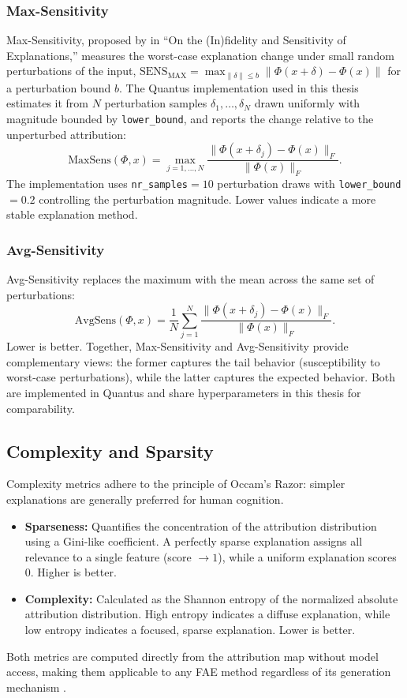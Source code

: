 \subsubsection{Max-Sensitivity}
Max-Sensitivity, proposed by \citet{yeh2019} in ``On the (In)fidelity and Sensitivity of Explanations,'' measures the worst-case explanation change under small random perturbations of the input,
$\mathrm{SENS}_{\mathrm{MAX}} = \max_{\|\delta\| \le b} \|\Phi(x + \delta) - \Phi(x)\|$ for a perturbation bound $b$.
The Quantus implementation used in this thesis estimates it from $N$
perturbation samples $\delta_1, \dots, \delta_N$ drawn uniformly with
magnitude bounded by \texttt{lower\_bound}, and reports the change relative to
the unperturbed attribution:
\begin{equation}
    \text{MaxSens}(\Phi, x) = \max_{j = 1, \dots, N} \frac{\|\Phi(x + \delta_j) - \Phi(x)\|_F}{\|\Phi(x)\|_F}.
\end{equation}
The implementation uses \texttt{nr\_samples}$= 10$ perturbation draws with \texttt{lower\_bound}$= 0.2$ controlling the perturbation magnitude. Lower values indicate a more stable explanation method.

\subsubsection{Avg-Sensitivity}
Avg-Sensitivity replaces the maximum with the mean across the same set of perturbations:
\begin{equation}
    \text{AvgSens}(\Phi, x) = \frac{1}{N} \sum_{j=1}^{N} \frac{\|\Phi(x + \delta_j) - \Phi(x)\|_F}{\|\Phi(x)\|_F}.
\end{equation}
Lower is better. Together, Max-Sensitivity and Avg-Sensitivity provide complementary views: the former captures the tail behavior (susceptibility to worst-case perturbations), while the latter captures the expected behavior. Both are implemented in Quantus \cite{hedstrom2023quantus} and share hyperparameters in this thesis for comparability.

\subsection{Complexity and Sparsity}
\label{subsec:complexity}
Complexity metrics adhere to the principle of Occam's Razor: simpler explanations are generally preferred for human cognition.
\begin{itemize}
    \item \textbf{Sparseness:} Quantifies the concentration of the attribution distribution using a Gini-like coefficient. A perfectly sparse explanation assigns all relevance to a single feature (score $\to 1$), while a uniform explanation scores $0$. Higher is better.
    \item \textbf{Complexity:} Calculated as the Shannon entropy of the normalized absolute attribution distribution. High entropy indicates a diffuse explanation, while low entropy indicates a focused, sparse explanation. Lower is better.
\end{itemize}
Both metrics are computed directly from the attribution map without model access, making them applicable to any FAE method regardless of its generation mechanism \cite{hedstrom2023quantus}.

